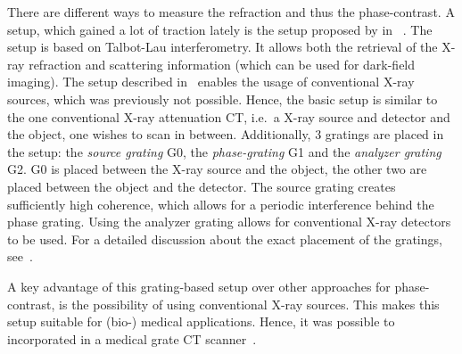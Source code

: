 There are different ways to measure the refraction and thus the phase-contrast. A setup, which
gained a lot of traction lately is the setup proposed by \citeauthor*{pfeiffer_phase_2006} in
~\cite{pfeiffer_phase_2006,pfeiffer_hard-x-ray_2008}. The setup is based on Talbot-Lau
interferometry. It allows both the retrieval of the X-ray refraction and scattering information
(which can be used for dark-field imaging). The setup described in~\cite{pfeiffer_hard-x-ray_2008}
enables the usage of conventional X-ray sources, which was previously not possible. Hence, the basic
setup is similar to the one conventional X-ray attenuation CT, i.e.\ a X-ray source and detector and
the object, one wishes to scan in between. Additionally, 3 gratings are placed in the setup: the
\textit{source grating} G0, the \textit{phase-grating} G1 and the \textit{analyzer grating} G2. G0
is placed between the X-ray source and the object, the other two are placed between the object and
the detector. The source grating creates sufficiently high coherence, which allows for a periodic
interference behind the phase grating. Using the analyzer grating allows for conventional X-ray
detectors to be used. For a detailed discussion about the exact placement of the gratings,
see~\cite{donath_inverse_2009}.

A key advantage of this grating-based setup over other approaches for phase-contrast, is the
possibility of using conventional X-ray sources. This makes this setup suitable for (bio-) medical
applications. Hence, it was possible to incorporated in a medical grate CT
scanner~\cite{viermetz_dark-field_2022}.

